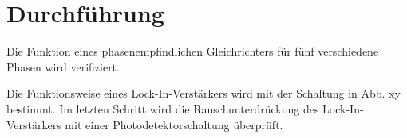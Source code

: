 \section{Durchführung}
\label{sec:Durchführung}

Die Funktion eines phasenempfindlichen Gleichrichters für fünf verschiedene Phasen wird verifiziert. 

Die Funktionsweise eines Lock-In-Verstärkers wird mit der Schaltung in Abb. xy bestimmt. 
Im letzten Schritt wird die Rauschunterdrückung des Lock-In-Verstärkers mit einer Photodetektorschaltung überprüft. 


